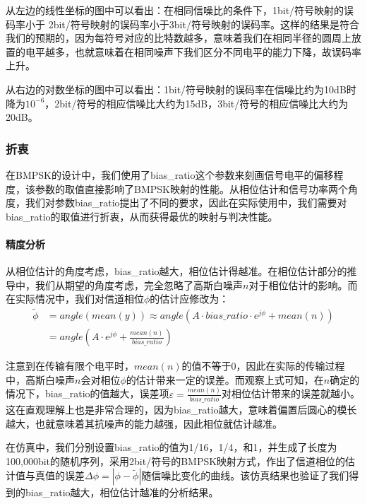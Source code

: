 从左边的线性坐标的图中可以看出：在相同信噪比的条件下，1bit/符号映射的误码率小于 2bit/符号映射的误码率小于3bit/符号映射的误码率。这样的结果是符合我们的预期的，因为每符号对应的比特数越多，意味着我们在相同半径的圆周上放置的电平越多，也就意味着在相同噪声下我们区分不同电平的能力下降，故误码率上升。

从右边的对数坐标的图中可以看出：1bit/符号映射的误码率在信噪比约为10dB时降为$10^{-6}$，2bit/符号的相应信噪比大约为15dB，3bit/符号的相应信噪比大约为20dB。

\subsubsection{折衷}

在BMPSK的设计中，我们使用了bias\_ratio这个参数来刻画信号电平的偏移程度，该参数的取值直接影响了BMPSK映射的性能。从相位估计和信号功率两个角度，我们对参数bias\_ratio提出了不同的要求，因此在实际使用中，我们需要对bias\_ratio的取值进行折衷，从而获得最优的映射与判决性能。

\paragraph{精度分析}
\indent

从相位估计的角度考虑，bias\_ratio越大，相位估计得越准。在相位估计部分的推导中，我们从期望的角度考虑，完全忽略了高斯白噪声$n$对于相位估计的影响。而在实际情况中，我们对信道相位$\phi$的估计应修改为：
\begin{equation*}
\begin{aligned}
    \tilde{\phi}&=angle(mean(y))
    \approx angle(A\cdot bias\_ratio\cdot e^{j\phi}+mean(n))\\
    &=angle(A\cdot e^{j\phi}+\frac{mean(n)}{bias\_ratio})
\end{aligned}
\end{equation*}

注意到在传输有限个电平时，$mean(n)$的值不等于0，因此在实际的传输过程中，高斯白噪声$n$会对相位$\phi$的估计带来一定的误差。而观察上式可知，在$n$确定的情况下，bias\_ratio的值越大，误差项$\varepsilon=\frac{mean(n)}{bias\_ratio}$对相位估计带来的误差就越小。这在直观理解上也是非常合理的，因为bias\_ratio越大，意味着偏置后圆心的模长越大，也就意味着其抗噪声的能力越强，因此相位就估计越准。

在仿真中，我们分别设置bias\_ratio的值为1/16，1/4，和1，并生成了长度为100,000bit的随机序列，采用2bit/符号的BMPSK映射方式，作出了信道相位的估计值与真值的误差$\Delta\phi=|\phi-\tilde{\phi}|$随信噪比变化的曲线。该仿真结果也验证了我们得到的bias\_ratio越大，相位估计越准的分析结果。

